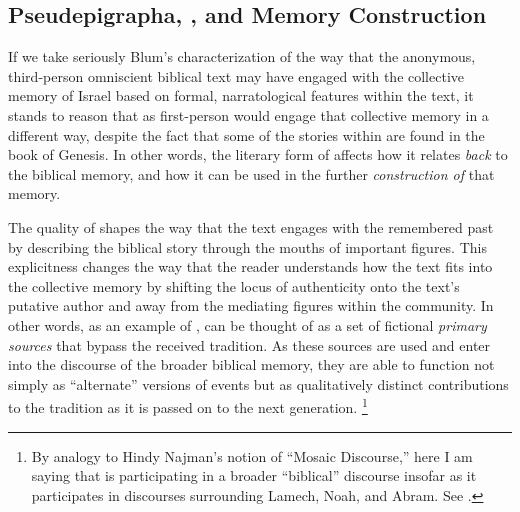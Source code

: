 \subsection{Pseudepigrapha, \ga, and Memory Construction}

If we take seriously Blum's characterization of the way that the anonymous, third-person omniscient biblical text may have engaged with the collective memory of Israel based on formal, narratological features within the text, it stands to reason that \ga as first-person \psy would engage that collective memory in a different way, despite the fact that some of the stories within \ga are found in the book of Genesis. In other words, the literary form of \ga affects how it relates \emph{back} to the biblical memory, and how it can be used in the further \emph{construction of} that memory.

The \psgraphic quality of \ga shapes the way that the text engages with the remembered past by describing the biblical story through the mouths of important figures. This explicitness changes the way that the reader understands how the text fits into the collective memory by shifting the locus of authenticity onto the text's putative author and away from the mediating figures within the community. In other words, as an example of \psy, \ga can be thought of as a set of fictional \emph{primary sources} that bypass the received tradition. As these sources are used and enter into the discourse of the broader biblical memory, they are able to function not simply as ``alternate'' versions of events but as qualitatively distinct contributions to the tradition as it is passed on to the next generation.%
    \footnote{By analogy to Hindy Najman's notion of ``Mosaic Discourse,'' here I am saying that \ga is participating in a broader ``biblical'' discourse insofar as it participates in discourses surrounding Lamech, Noah, and Abram. See \cite[1--40]{najman2003}.}

